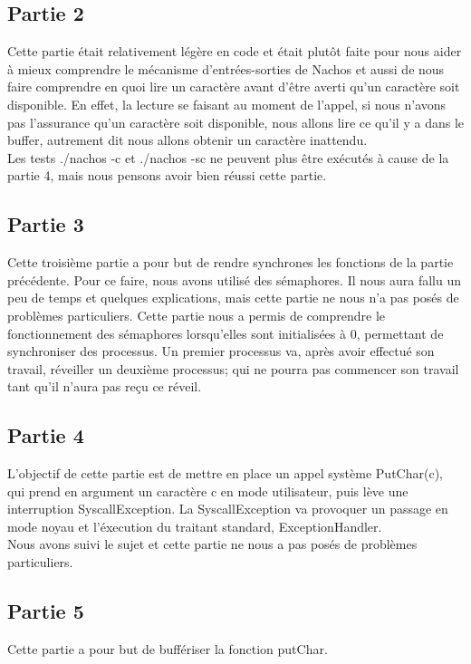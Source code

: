 \documentclass[a4paper]{article}
\begin{document}
\subsection{Partie 2}
Cette partie était relativement légère en code et était plutôt faite pour nous
aider à mieux comprendre le mécanisme d'entrées-sorties de Nachos et aussi de nous
faire comprendre en quoi lire un caractère avant d'être averti qu'un caractère
soit disponible. En effet, la lecture se faisant au moment de l'appel, si nous
n'avons pas l'assurance qu'un caractère soit disponible, nous allons lire ce
qu'il y a dans le buffer, autrement dit nous allons obtenir un caractère inattendu. \\
Les tests ./nachos -c et ./nachos -sc ne peuvent plus être exécutés à cause de
la partie 4, mais nous pensons avoir bien réussi cette partie.

\subsection{Partie 3}
Cette troisième partie a pour but de rendre synchrones les fonctions de la partie
précédente. Pour ce faire, nous avons utilisé des sémaphores. Il nous aura fallu
un peu de temps et quelques explications, mais cette partie ne nous n'a pas posés
de problèmes particuliers. Cette partie nous a permis de comprendre le fonctionnement
des sémaphores lorsqu'elles sont initialisées à 0, permettant de synchroniser
des processus. Un premier processus va, après avoir effectué son travail, réveiller
un deuxième processus; qui ne pourra pas commencer son travail tant qu'il n'aura
pas reçu ce réveil.

\subsection{Partie 4}
L'objectif de cette partie est de mettre en place un appel système PutChar(c),
qui prend en argument un caractère c en mode utilisateur, puis lève une interruption
SyscallException. La SyscallException va provoquer un passage en mode noyau et
l'éxecution du traitant standard, ExceptionHandler. \\
Nous avons suivi le sujet et cette partie ne nous a pas posés de problèmes particuliers.

\newpage
\subsection{Partie 5}
Cette partie a pour but de buffériser la fonction putChar.
\end{document}
